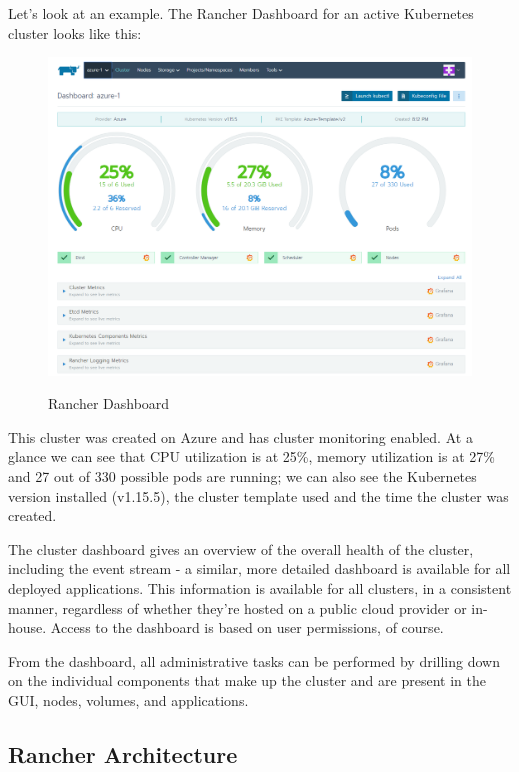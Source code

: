 Let's look at an example. The Rancher Dashboard for an active Kubernetes cluster looks like this:

\begin{figure}[H]
\centering
\caption {Rancher Dashboard}
\includegraphics[width=\linewidth]{images/dashboard}
\label{fig:rancherDashboard}
\end{figure}

This cluster was created on Azure and has cluster monitoring enabled. At a glance we can see that CPU utilization is at 25\%, memory utilization is at 27\% and 27 out of 330 possible pods are running; we can also see the Kubernetes version installed (v1.15.5), the cluster template used and the time the cluster was created.

The cluster dashboard gives an overview of the overall health of the cluster, including the event stream - a similar, more detailed dashboard is available for all deployed applications. This information is available for all clusters, in a consistent manner, regardless of whether they're hosted on a public cloud provider or in-house. Access to the dashboard is based on user permissions, of course.

From the dashboard, all administrative tasks can be performed by drilling down on the individual components that make up the cluster and are present in the GUI, nodes, volumes, and applications.

\subsection{Rancher Architecture}

